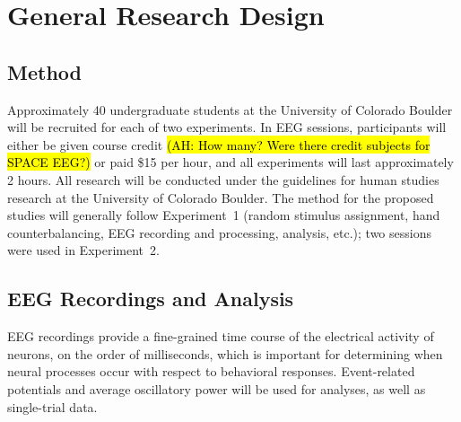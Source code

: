 
\section{General Research Design}

\subsection{Method}



Approximately 40 undergraduate students at the University of Colorado Boulder will be recruited for each of two experiments.  In EEG sessions, participants will either be given course credit \hl{(AH: How many? Were there credit subjects for SPACE EEG?)} or paid \$15 per hour, and all experiments will last approximately 2 hours.  All research will be conducted under the guidelines for human studies research at the University of Colorado Boulder.  The method for the proposed studies will generally follow Experiment~1 (random stimulus assignment, hand counterbalancing, EEG recording and processing, analysis, etc.); two sessions were used in Experiment~2.


\subsection{EEG Recordings and Analysis}

EEG recordings provide a fine-grained time course of the electrical
activity of neurons, on the order of milliseconds, which is important
for determining when neural processes occur with respect to behavioral
responses.  Event-related potentials and average oscillatory power will be used for analyses, as well as single-trial data.

